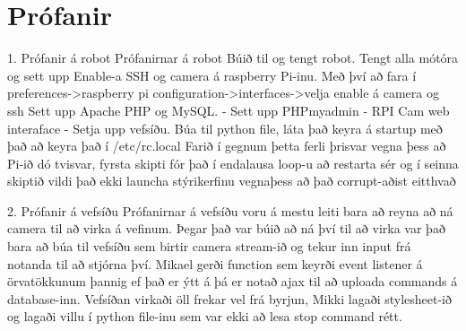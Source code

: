 \section{Prófanir}
1. Prófanir á robot
Prófanirnar á robot 
Búið til og tengt robot.
Tengt alla mótóra og sett upp 
Enable-a SSH og camera á raspberry Pi-inu. Með því að fara í preferences->raspberry pi configuration->interfaces->velja enable á camera og ssh
Sett upp Apache PHP og MySQL. - \cite{stewright}
Sett upp PHPmyadmin - \cite{stewright2}
RPI Cam web interaface - \cite{elinux}
Setja upp vefsíðu.
Búa til python file, láta það keyra á startup með það að keyra það í /etc/rc.local
Farið í gegnum þetta ferli þrisvar vegna þess að Pi-ið dó tvisvar, fyrsta skipti fór það í endalausa  loop-u að restarta sér og í seinna skiptið vildi það ekki launcha stýrikerfinu vegnaþess að það corrupt-aðist eitthvað

2. Prófanir á vefsíðu
Prófanirnar á vefsíðu voru á mestu leiti bara að reyna að ná camera til að virka á vefinum. 
Þegar það var búið að ná því til að virka var það bara að búa til vefsíðu sem birtir camera stream-ið og tekur inn input frá notanda til að stjórna því.
Mikael gerði function sem keyrði event listener á örvatökkunum þannig ef það er ýtt á þá er notað ajax til að uploada commands á database-inn.
Vefsíðan virkaði öll frekar vel frá byrjun, Mikki lagaði stylesheet-ið og lagaði villu í python file-inu sem var ekki að lesa stop command rétt.